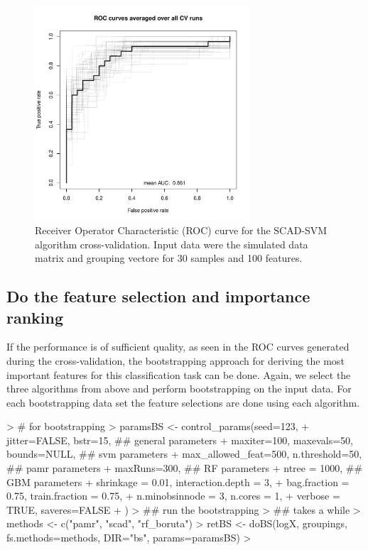 \documentclass[11pt,a4paper]{article}
\begin{document}
\begin{figure}[htp]
\centering
\includegraphics[width=8cm,height=8cm]{rocscad}
\caption{Receiver Operator Characteristic (ROC) curve for the SCAD-SVM algorithm cross-validation. Input data were the simulated data matrix and grouping vectore for 30 samples and 100 features.}
\label{fig:rocscad}
\end{figure}



\subsection{Do the feature selection and importance ranking}

If the performance is of sufficient quality, as seen in the ROC curves generated during the cross-validation, the bootstrapping approach for deriving the most important features for this classification task can be done. Again, we select the three algorithms from above and perform bootstrapping on the input data. For each bootstrapping data set the feature selections are done using each algorithm. 

\begin{Schunk}
\begin{Sinput}
> # for bootstrapping
> paramsBS <- control_params(seed=123,
+  jitter=FALSE, bstr=15,                  ## general parameters
+  maxiter=100, maxevals=50, bounds=NULL,  ## svm parameters
+  max_allowed_feat=500, n.threshold=50,   ## pamr parameters
+  maxRuns=300,                            ## RF parameters
+  ntree = 1000,                           ## GBM parameters
+  shrinkage = 0.01, interaction.depth = 3,
+  bag.fraction = 0.75, train.fraction = 0.75, 
+  n.minobsinnode = 3, n.cores = 1, 
+  verbose = TRUE, saveres=FALSE
+ )
> ## run the bootstrapping
> ## takes a while
> methods <- c("pamr", "scad", "rf_boruta")
> retBS <- doBS(logX, groupings, fs.methods=methods, DIR="bs", params=paramsBS)
> 
\end{Sinput}
\end{Schunk}
\end{document}
